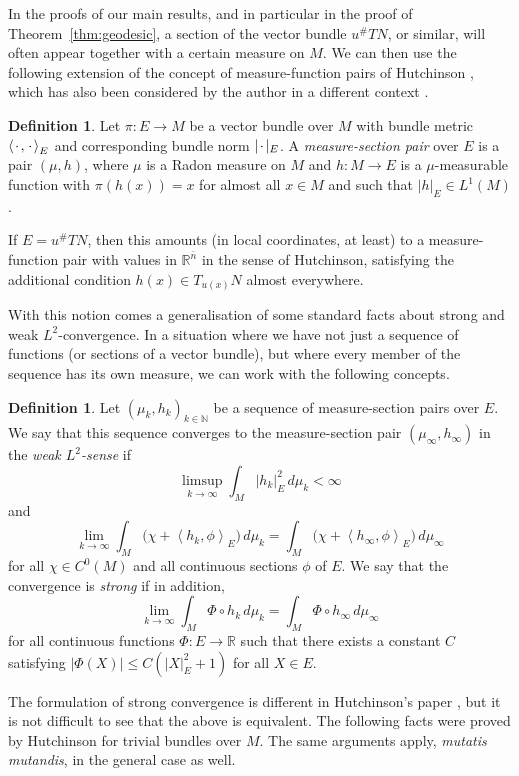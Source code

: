\documentclass[a4paper]{article}
\newcommand{\R}{\mathbb{R}}
\newcommand{\N}{\mathbb{N}}
\newcommand{\ndim}{{\bar{n}}}
\newcommand{\blank}{{\mkern 2mu\cdot\mkern 2mu}}
\newcommand{\scp}[2]{\left\langle #1, #2 \right\rangle}
\theoremstyle{definition}
\newtheorem{definition}[theorem]{Definition}
\theoremstyle{remark}
\begin{document}
In the proofs of our main results, and in particular in the proof of Theorem~\ref{thm:geodesic}, a section of the vector bundle $u^\# TN$, or similar, will
often appear together with a certain measure on $M$. We can then use the following extension of the concept of measure-function pairs of Hutchinson \cite{Hutchinson:86}, which has also been considered by the
author in a different context \cite{Moser:15.2}.

\begin{definition}
Let $\pi \colon E \to M$ be a vector bundle over $M$ with bundle metric
$\scp{\blank}{\blank}_E$ and corresponding bundle norm $|\blank|_E$.
A \emph{measure-section pair} over $E$ is a pair
$(\mu, h)$, where $\mu$ is a Radon measure on $M$ and $h \colon M \to E$
is a $\mu$-measurable function with $\pi(h(x)) = x$ for almost all $x \in M$
and such that $|h|_E \in L^1(M)$.
\end{definition}

If $E = u^\# TN$, then this amounts (in local coordinates, at least) to a measure-function
pair with values in $\R^\ndim$ in the sense of Hutchinson,
satisfying the additional condition $h(x) \in T_{u(x)} N$ almost everywhere.

With this notion comes a generalisation of some standard facts about strong and weak $L^2$-convergence.
In a situation where we have not just a sequence of functions (or sections of a
vector bundle), but where every member of the sequence has its own measure, we can work with the following concepts.

\begin{definition}
Let $(\mu_k, h_k)_{k \in \N}$ be a sequence of measure-section pairs over $E$.
We say that this sequence converges to the measure-section pair $(\mu_\infty, h_\infty)$ in the \emph{weak $L^2$-sense} if
\[
\limsup_{k \to \infty} \int_M |h_k|_E^2 \, d\mu_k < \infty
\]
and
\[
\lim_{k \to \infty} \int_ M \bigl(\chi + \scp{h_k}{\phi}_E\bigr) \, d\mu_k = \int_ M \bigl(\chi + \scp{h_\infty}{\phi}_E\bigr) \, d\mu_\infty
\]
for all $\chi \in C^0(M)$ and all continuous sections $\phi$ of $E$.
We say that the convergence is \emph{strong} if in addition,
\[
\lim_{k \to \infty} \int_M \Phi \circ h_k \, d\mu_k = \int_M \Phi \circ h_\infty \, d\mu_\infty
\]
for all continuous functions $\Phi \colon E \to \R$ such that there exists a
constant $C$ satisfying $|\Phi(X)| \le C(|X|_E^2 + 1)$ for all $X \in E$.
\end{definition}

The formulation of strong convergence is different in Hutchinson's paper \cite{Hutchinson:86},
but it is not difficult to see that the above is equivalent.
The following facts were proved by Hutchinson \cite[Theorem 4.4.2]{Hutchinson:86}
for trivial bundles over $M$. The same arguments apply,
\emph{mutatis mutandis}, in the general case as well.
\end{document}
